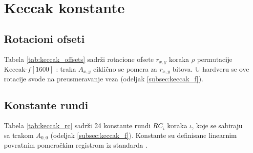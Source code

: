 \chapter{Keccak konstante}
\label{app:keccak}

\section{Rotacioni ofseti}
\label{app:keccak_offsets}

Tabela \ref{tab:keccak_offsets} sadrži rotacione ofsete $r_{x,y}$ koraka $\rho$ permutacije Keccak-$f[1600]$ \cite{fips202}: traka $A_{x,y}$ ciklično se pomera za $r_{x,y}$ bitova. U hardveru se ove rotacije svode na preusmeravanje veza (odeljak \ref{subsec:keccak_f}).

\begin{table}[H]
\caption{Rotacioni ofseti $r_{x,y}$ koraka $\rho$}
\centering
\renewcommand{\arraystretch}{1.15}
\resizebox{0.6\textwidth}{!}{

}
\label{tab:keccak_offsets}
\end{table}

\section{Konstante rundi}
\label{app:keccak_rc}

Tabela \ref{tab:keccak_rc} sadrži 24 konstante rundi $RC_i$ koraka $\iota$, koje se sabiraju sa trakom $A_{0,0}$ (odeljak \ref{subsec:keccak_f}). Konstante su definisane linearnim povratnim pomeračkim registrom iz standarda \cite{fips202}.

\begin{table}[H]
\caption{Konstante rundi $RC_i$ permutacije Keccak-$f[1600]$ (heksadecimalno)}
\centering
\renewcommand{\arraystretch}{1.15}
\resizebox{0.85\textwidth}{!}{

}
\label{tab:keccak_rc}
\end{table}
